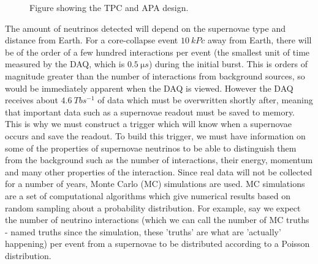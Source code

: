 \documentclass[a4paper,12,oneside,notitlepage]{report}
\begin{document}
\begin{figure} [H]
\begin{center}
\caption{Figure showing the TPC and APA design. \cite{LBNETPCppt} \label{fig:TPCFig1}}
\end{center}
\end{figure}
\noindent The amount of neutrinos detected will depend on the supernovae type and distance from Earth. For a core-collapse event $\SI{10}{kPc}$ away from Earth, there will be of the order of a few hundred interactions per event (the smallest unit of time measured by the DAQ, which is $\SI{0.5}{\micro s}$) during the initial burst. This is orders of magnitude greater than the number of interactions from background sources, so would be immediately apparent when the DAQ is viewed. However the DAQ receives about $\SI{4.6}{Tb s^{-1}}$ of data which must be overwritten shortly after, meaning that important data such as a supernovae readout must be saved to memory. This is why we must construct a trigger which will know when a supernovae occurs and save the readout. To build this trigger, we must have information on some of the properties of supernovae neutrinos to be able to distinguish them from the background such as the number of interactions, their energy, momentum and many other properties of the interaction. Since real data will not be collected for a number of years, Monte Carlo (MC) simulations are used. MC simulations are a set of computational algorithms which give numerical results based on random sampling about a probability distribution. For example, say we expect the number of neutrino interactions (which we can call the number of MC truths - named truths since the simulation, these 'truths' are what are 'actually' happening) per event from a supernovae to be distributed according to a Poisson distribution.
\end{document}
